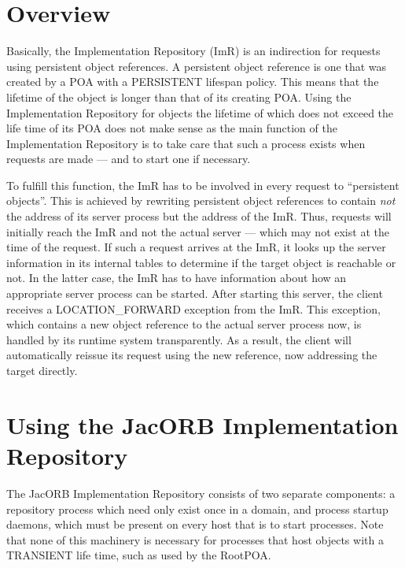 \documentclass[12pt]{scrbook}
\begin{document}
\section{Overview}

Basically, the  Implementation Repository (ImR) is  an indirection for
requests  using  persistent  object  references. A  persistent  object
reference is one that was created  by a POA with a PERSISTENT lifespan
policy. This means that the lifetime of the object is longer than that
of its creating POA.   Using the Implementation Repository for objects
the lifetime  of which does not exceed  the life time of  its POA does
not make sense  as the main function of  the Implementation Repository
is to take care that such  a process exists when requests are made ---
and to start one if necessary.

To fulfill this function, the ImR  has to be involved in every request
to ``persistent  objects''.  This is achieved  by rewriting persistent
object  references to  contain {\em  not}  the address  of its  server
process but  the address  of the ImR.   Thus, requests  will initially
reach the ImR and not the actual server --- which may not exist at the
time of the request. If such a request arrives at the ImR, it looks up
the  server information  in its  internal tables  to determine  if the
target object is reachable or not.  In the latter case, the ImR has to
have  information  about how  an  appropriate  server  process can  be
started.   After   starting  this   server,  the  client   receives  a
LOCATION\_FORWARD  exception  from  the  ImR.  This  exception,  which
contains a new  object reference to the actual  server process now, is
handled by its runtime system  transparently.  As a result, the client
will automatically  reissue its request  using the new  reference, now
addressing the target directly.

\section{Using the JacORB Implementation Repository}

The  JacORB   Implementation  Repository  consists   of  two  separate
components:  a repository  process which  need  only exist  once in  a
domain, and  process startup daemons,  which must be present  on every
host that is  to start processes. Note that none  of this machinery is
necessary for processes that host  objects with a TRANSIENT life time,
such as used by the RootPOA.
\end{document}
